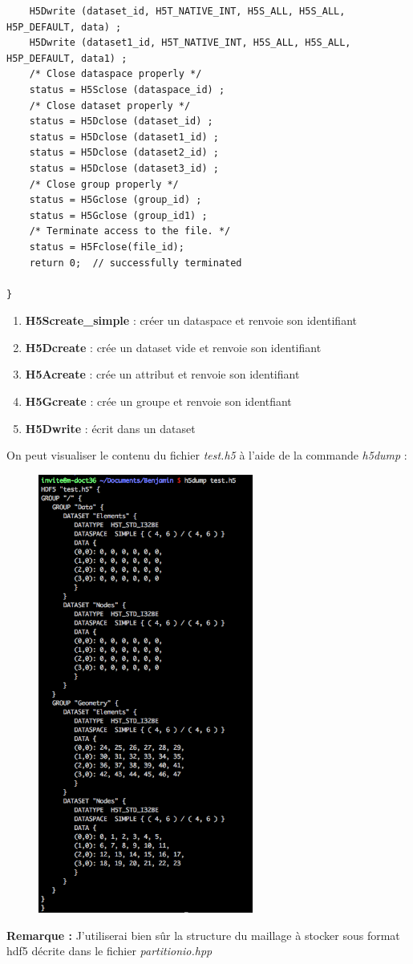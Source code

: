 \documentclass[12pt]{article}
\begin{document}
\begin{lstlisting}
    H5Dwrite (dataset_id, H5T_NATIVE_INT, H5S_ALL, H5S_ALL, H5P_DEFAULT, data) ;
    H5Dwrite (dataset1_id, H5T_NATIVE_INT, H5S_ALL, H5S_ALL, H5P_DEFAULT, data1) ;
    /* Close dataspace properly */
    status = H5Sclose (dataspace_id) ;
    /* Close dataset properly */
    status = H5Dclose (dataset_id) ;
    status = H5Dclose (dataset1_id) ;
    status = H5Dclose (dataset2_id) ;
    status = H5Dclose (dataset3_id) ;
    /* Close group properly */
    status = H5Gclose (group_id) ;
    status = H5Gclose (group_id1) ;
    /* Terminate access to the file. */
    status = H5Fclose(file_id); 
    return 0;  // successfully terminated

}
\end{lstlisting}
\begin{enumerate}
    \item \textbf{H5Screate\_simple} : créer un dataspace et renvoie son identifiant
    \item \textbf{H5Dcreate} : crée un dataset vide et renvoie son identifiant
    \item \textbf{H5Acreate} : crée un attribut et renvoie son identifiant
    \item \textbf{H5Gcreate} : crée un groupe et renvoie son identfiant
    \item \textbf{H5Dwrite}  : écrit dans un dataset 
\end{enumerate}
\newpage
On peut visualiser le contenu du fichier \emph{test.h5} à l'aide de la commande \emph{h5dump} :\newline
\begin{figure}[h!]
    \begin{center}
        \includegraphics[width=200pt]{test.png}
    \end{center}
\end{figure}
\textbf{Remarque :} J'utiliserai bien sûr la structure du maillage à stocker sous format hdf5 décrite dans le fichier \emph{partitionio.hpp} 
\end{document}
